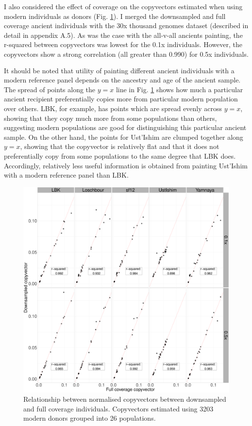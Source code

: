 I also considered the effect of coverage on the copyvectors estimated when using modern individuals as donors (Fig. \ref{fig:CP_correlation_allSamples_0.1x_0.5x_30x_moderns}). I merged the downsampled and full coverage ancient individuals with the 30x thousand genomes dataset (described in detail in appendix A.5). As was the case with the all-v-all ancients painting, the r-squared between copyvectors was lowest for the 0.1x individuals. However, the copyvectors show a strong correlation (all greater than 0.990) for 0.5x individuals.  

It should be noted that utility of painting different ancient individuals with a modern reference panel depends on the ancestry and age of the ancient sample. The spread of points along the $y=x$ line in Fig. \ref{fig:CP_correlation_allSamples_0.1x_0.5x_30x_moderns} shows how much a particular ancient recipient preferentially copies more from particular modern population over others. LBK, for example, has points which are spread evenly across $y=x$, showing that they copy much more from some populations than others, suggesting modern populations are good for distinguishing this particular ancient sample. On the other hand, the points for Ust'Ishim are clumped together along $y=x$, showing that the copyvector is relatively flat and that it does not preferentially copy from some populations to the same degree that LBK does. Accordingly, relatively less useful information is obtained from painting Ust'Ishim with a modern reference panel than LBK.

\begin{figure}[htp]
    \centering
    \includegraphics[width=1.0\textwidth]{../images/chapter1/CP_correlation_allSamples_0.1x_0.5x_30x_moderns.pdf}
    \caption{Relationship between normalised copyvectors between downsampled and full coverage individuals. Copyvectors estimated using 3203 modern donors grouped into 26 populations.}
    \label{fig:CP_correlation_allSamples_0.1x_0.5x_30x_moderns}
\end{figure}

